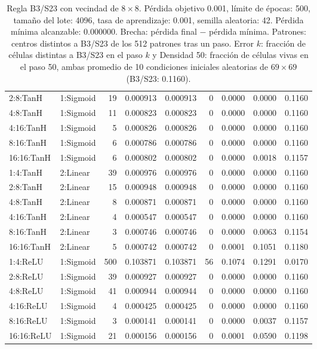 \begin{table}[H]
\begin{tabular}{llrrrrrrr}
		2:8:TanH & 1:Sigmoid & 19 & 0.000913 & 0.000913 & 0 & 0.0000 & 0.0000 & 0.1160 \\
		4:8:TanH & 1:Sigmoid & 11 & 0.000823 & 0.000823 & 0 & 0.0000 & 0.0000 & 0.1160 \\
		4:16:TanH & 1:Sigmoid & 5 & 0.000826 & 0.000826 & 0 & 0.0000 & 0.0000 & 0.1160 \\
		8:16:TanH & 1:Sigmoid & 6 & 0.000786 & 0.000786 & 0 & 0.0000 & 0.0000 & 0.1160 \\
		16:16:TanH & 1:Sigmoid & 6 & 0.000802 & 0.000802 & 0 & 0.0000 & 0.0018 & 0.1157 \\
		\midrule
		1:4:TanH & 2:Linear & 39 & 0.000976 & 0.000976 & 0 & 0.0000 & 0.0000 & 0.1160 \\
		2:8:TanH & 2:Linear & 15 & 0.000948 & 0.000948 & 0 & 0.0000 & 0.0000 & 0.1160 \\
		4:8:TanH & 2:Linear & 8 & 0.000871 & 0.000871 & 0 & 0.0000 & 0.0000 & 0.1160 \\
		4:16:TanH & 2:Linear & 4 & 0.000547 & 0.000547 & 0 & 0.0000 & 0.0000 & 0.1160 \\
		8:16:TanH & 2:Linear & 3 & 0.000746 & 0.000746 & 0 & 0.0000 & 0.0063 & 0.1154 \\
		16:16:TanH & 2:Linear & 5 & 0.000742 & 0.000742 & 0 & 0.0001 & 0.1051 & 0.1180 \\
		\midrule
		1:4:ReLU & 1:Sigmoid & 500 & 0.103871 & 0.103871 & 56 & 0.1074 & 0.1291 & 0.0170 \\
		2:8:ReLU & 1:Sigmoid & 39 & 0.000927 & 0.000927 & 0 & 0.0000 & 0.0000 & 0.1160 \\
		4:8:ReLU & 1:Sigmoid & 41 & 0.000944 & 0.000944 & 0 & 0.0000 & 0.0000 & 0.1160 \\
		4:16:ReLU & 1:Sigmoid & 4 & 0.000425 & 0.000425 & 0 & 0.0000 & 0.0000 & 0.1160 \\
		8:16:ReLU & 1:Sigmoid & 3 & 0.000141 & 0.000141 & 0 & 0.0000 & 0.0037 & 0.1157 \\
		16:16:ReLU & 1:Sigmoid & 21 & 0.000156 & 0.000156 & 0 & 0.0001 & 0.0590 & 0.1198 \\
		\bottomrule
	\end{tabular}
	\caption{Regla B3/S23 con vecindad de $8\times8$. Pérdida objetivo 0.001, límite de épocas: 500, tamaño del lote: 4096, tasa de aprendizaje: 0.001, semilla aleatoria: 42. Pérdida mínima alcanzable: 0.000000. Brecha: pérdida final $-$ pérdida mínima. Patrones: centros distintos a B3/S23 de los 512 patrones tras un paso. Error $k$: fracción de células distintas a B3/S23 en el paso $k$ y Densidad 50: fracción de células vivas en el paso 50, ambas promedio de 10 condiciones iniciales aleatorias de $69\times69$ (B3/S23: 0.1160).}
	\label{tab:vecindad_8x8}
\end{table}
